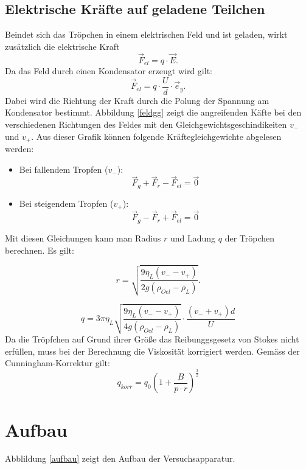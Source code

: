 \documentclass[11pt,ngerman,a4paper]{article}
\begin{document}
\subsection{Elektrische Kr\"afte auf geladene Teilchen} 
Beindet sich das Tr\"opchen in einem elektrischen Feld und ist geladen, wirkt zus\"atzlich die elektrische Kraft
\[
\vec F_{el} = q\cdot \vec E \mathrm{.}
\]
Da das Feld durch einen Kondensator erzeugt wird gilt:
\[
\vec F_{el} = q\cdot \frac{U}{d} \cdot \vec e_y\mathrm{.}
\]
Dabei wird die Richtung der Kraft durch die Polung der Spannung am Kondensator bestimmt. Abbildung \ref{feldgg} zeigt die angreifenden K\"afte bei den verschiedenen Richtungen des Feldes mit den Gleichgewichtsgeschindikeiten $v_-$ und $v_+$. Aus dieser Grafik k\"onnen folgende Kr\"aftegleichgewichte abgelesen werden:
\begin{itemize}
\item Bei fallendem Tropfen ($v_-$):
\begin{equation}
\vec F_g+ \vec F_r - \vec F_{el}= \vec 0
\label{gg-}
\end{equation}

\item Bei steigendem Tropfen ($v_+$):
\begin{equation}
\vec F_g -\vec F_r +\vec F_{el}= \vec 0
\label{gg+}
\end{equation}
\end{itemize}
Mit diesen Gleichungen kann man Radius $r$ und Ladung $q$ der Tr\"opchen berechnen. Es gilt:

\begin{equation}
r = \sqrt{\frac{9 \eta_L (v_--v_+)}{2g\left(\rho_{Oel}-\rho_{L}\right)}}\mathrm{.}
\label{r+-}
\end{equation}

\begin{equation}
q = 3\pi\eta_L\sqrt{\frac{9 \eta_L (v_--v_+)}{4g\left(\rho_{Oel}-\rho_{L}\right)}}\cdot \frac{(v_-+v_+)d}{U}
\label{q+-}
\end{equation}
Da die Tr\"opfchen auf Grund ihrer Gr\"o\ss e das Reibunggsgesetz von Stokes nicht erf\"ullen, muss bei der Berechnung die Viskosit\"at korrigiert werden. Gem\"ass der Cunningham-Korrektur gilt:
\begin{equation}
q_{korr} = q_0 \left( 1+ \frac B{p\cdot r}\right)^{\frac32}
\end{equation}

\section{Aufbau}
Abblildung \ref{aufbau} zeigt den Aufbau der Versuchsapparatur.
\end{document}
